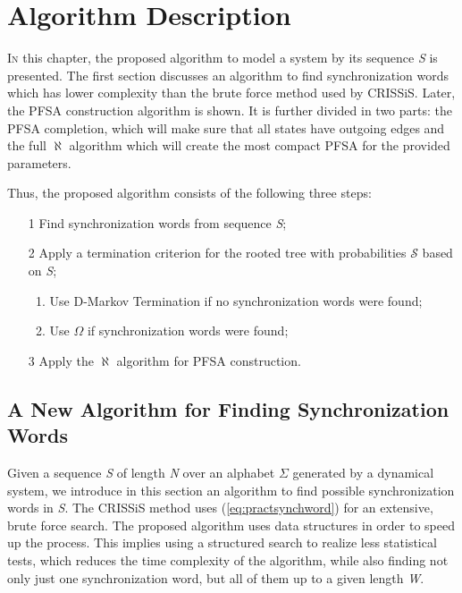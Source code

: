 \chapter{Algorithm Description}\label{cap:3}



{\lettrine[loversize=0.25,findent=0.2em,nindent=0em]{I}{n} this chapter, the proposed algorithm to model a system by its sequence \textit{S} is presented. The first section discusses an algorithm to find synchronization words which has lower complexity than the brute force method used by CRISSiS. Later, the PFSA construction algorithm is shown. It is further divided in two parts: the PFSA completion, which will make sure that all states have outgoing edges and the full $\aleph$ algorithm which will create the most compact PFSA for the provided parameters. 

Thus, the proposed algorithm consists of the following three steps: 


\begin{enumerate}
\item[1] Find synchronization words from sequence \textit{S};
\item[2] Apply a termination criterion for the rooted tree with probabilities $\mathcal{S}$ based on \textit{S};
	\begin{enumerate}
	\item Use D-Markov Termination if no synchronization words were found;
	\item Use $\Omega$ if synchronization words were found;
	\end{enumerate}
\item[3] Apply the $\aleph$ algorithm for PFSA construction.
\end{enumerate}

\section{A New Algorithm for Finding Synchronization Words}

Given a sequence \textit{S} of length \textit{N} over an alphabet $\Sigma$ generated by a dynamical system, we introduce in this section an algorithm to find possible synchronization words in \textit{S}. The CRISSiS method uses (\ref{eq:practsynchword}) for an extensive, brute force search.  The proposed algorithm uses data structures in order to speed up the process. This implies using a structured search to realize less statistical tests, which reduces the time complexity of the algorithm, while also finding not only just one synchronization word, but all of them up to a given length \textit{W}.

}
